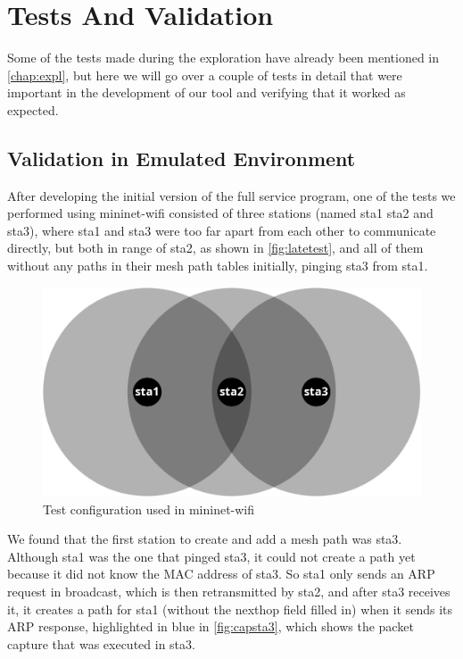 \chapter{Tests And Validation}\label{chap:tests}

Some of the tests made during the exploration have already been mentioned in
\autoref{chap:expl}, but here we will go over a couple of tests in detail that
were important in the development of our tool and verifying that it worked as
expected.

\section{Validation in Emulated Environment}

After developing the initial version of the full service program, one of the
tests we performed using mininet-wifi consisted of three stations (named sta1
sta2 and sta3), where sta1 and sta3 were too far apart from each other to
communicate directly, but both in range of sta2, as shown in
\autoref{fig:latetest}, and all of them without any paths in their mesh path
tables initially, pinging sta3 from sta1.

\begin{figure}[htb]
   \centering
   \includegraphics[scale=.3]{latetest}
   \caption{Test configuration used in mininet-wifi}\label{fig:latetest}
\end{figure}

We found that the first station to create and add a mesh path was sta3. Although
sta1 was the one that pinged sta3, it could not create a path yet because it did
not know the \ac{MAC} address of sta3. So sta1 only sends an ARP request in
broadcast, which is then retransmitted by sta2, and after sta3 receives it, it
creates a path for sta1 (without the nexthop field filled in) when it sends its
ARP response, highlighted in blue in \autoref{fig:capsta3}, which shows the
packet capture that was executed in sta3.

